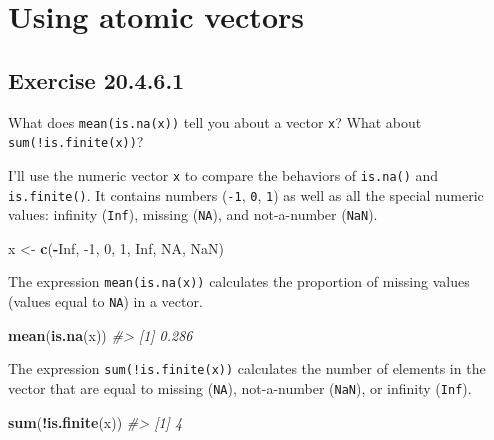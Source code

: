 \documentclass[]{book}
\newenvironment{Shaded}{\begin{snugshade}}{\end{snugshade}}
\newcommand{\CommentTok}[1]{\textcolor[rgb]{0.56,0.35,0.01}{\textit{#1}}}
\newcommand{\DecValTok}[1]{\textcolor[rgb]{0.00,0.00,0.81}{#1}}
\newcommand{\KeywordTok}[1]{\textcolor[rgb]{0.13,0.29,0.53}{\textbf{#1}}}
\newcommand{\NormalTok}[1]{#1}
\newcommand{\OperatorTok}[1]{\textcolor[rgb]{0.81,0.36,0.00}{\textbf{#1}}}
\newcommand{\OtherTok}[1]{\textcolor[rgb]{0.56,0.35,0.01}{#1}}
\newcommand{\StringTok}[1]{\textcolor[rgb]{0.31,0.60,0.02}{#1}}
\theoremstyle{plain}
\theoremstyle{remark}
\begin{document}
\hypertarget{using-atomic-vectors}{%
\section{Using atomic vectors}\label{using-atomic-vectors}}

\hypertarget{exercise-20.4.6.1}{%
\subsection*{\texorpdfstring{Exercise {20.4.6.1}}{Exercise 20.4.6.1}}\label{exercise-20.4.6.1}}

What does \texttt{mean(is.na(x))} tell you about a vector \texttt{x}? What about \texttt{sum(!is.finite(x))}?

I'll use the numeric vector \texttt{x} to compare the behaviors of \texttt{is.na()}
and \texttt{is.finite()}. It contains numbers (\texttt{-1}, \texttt{0}, \texttt{1}) as
well as all the special numeric values: infinity (\texttt{Inf}),
missing (\texttt{NA}), and not-a-number (\texttt{NaN}).

\begin{Shaded}
\begin{Highlighting}[]
\NormalTok{x <-}\StringTok{ }\KeywordTok{c}\NormalTok{(}\OperatorTok{-}\OtherTok{Inf}\NormalTok{, }\DecValTok{-1}\NormalTok{, }\DecValTok{0}\NormalTok{, }\DecValTok{1}\NormalTok{, }\OtherTok{Inf}\NormalTok{, }\OtherTok{NA}\NormalTok{, }\OtherTok{NaN}\NormalTok{)}
\end{Highlighting}
\end{Shaded}

The expression \texttt{mean(is.na(x))} calculates the proportion of missing values (values equal to \texttt{NA}) in a vector.

\begin{Shaded}
\begin{Highlighting}[]
\KeywordTok{mean}\NormalTok{(}\KeywordTok{is.na}\NormalTok{(x))}
\CommentTok{#> [1] 0.286}
\end{Highlighting}
\end{Shaded}

The expression \texttt{sum(!is.finite(x))} calculates the number of elements in the vector that are equal to missing (\texttt{NA}), not-a-number (\texttt{NaN}), or infinity (\texttt{Inf}).

\begin{Shaded}
\begin{Highlighting}[]
\KeywordTok{sum}\NormalTok{(}\OperatorTok{!}\KeywordTok{is.finite}\NormalTok{(x))}
\CommentTok{#> [1] 4}
\end{Highlighting}
\end{Shaded}
\end{document}
